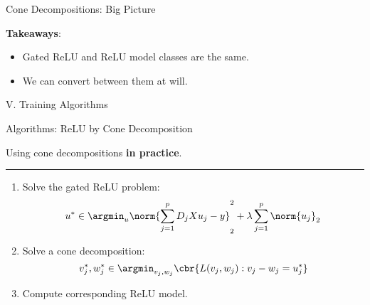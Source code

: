\documentclass[usenames,dvipsnames,mathserif,notheorems]{beamer}
\newcommand{\horizontalrule}{
	{
			\vspace{-0.5em}
			\center \rule{\textwidth}{0.1em}
			\vspace{-0.2em}
		}
}
\begin{document}
\begin{frame}{Cone Decompositions: Big Picture}
	\begin{figure}[]
		\centering
		
	\end{figure}
	\pause

	\textbf{Takeaways}:

	\vspace{0.5em}
	\begin{itemize}
		\item Gated ReLU and ReLU model classes are the same.
		\item We can convert between them at will.
	\end{itemize}
\end{frame}



\begin{frame}{}
	\begin{center}
		\huge V. Training Algorithms
	\end{center}
\end{frame}

\begin{frame}{Algorithms: ReLU by Cone Decomposition}
	\begin{center}
		\large Using cone decompositions \textbf{in practice}.
	\end{center}

	\pause
	\horizontalrule

	\begin{enumerate}
		\item Solve the gated ReLU problem:
		      \[
			      u^* \in \argmin_{u} \norm{\sum_{j=1}^p D_j X u_j - y}_2^2 + \lambda \sum_{j=1}^p \norm{u_j}_2
		      \]
		      \pause
		\item Solve a cone decomposition:
		      \[
			      v_j^*, w_j^* \in \argmin_{v_j, w_j} \cbr{ L(v_j, w_j) : v_j - w_j = u^*_j}
		      \]
		      \pause

		\item Compute corresponding ReLU model.
	\end{enumerate}

\end{frame}
\end{document}
